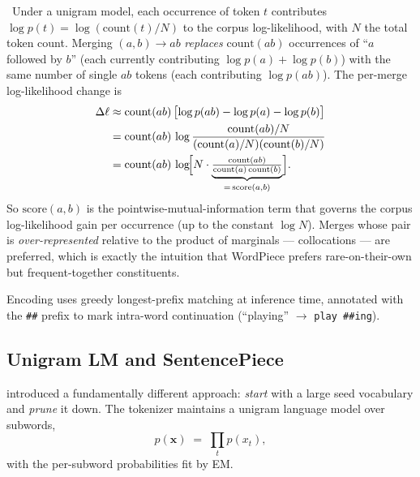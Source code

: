\begin{derivation}
\Assum\ Under a unigram model, each occurrence of token $t$
contributes $\log p(t) = \log(\mathrm{count}(t)/N)$ to the corpus
log-likelihood, with $N$ the total token count. Merging
$(a,b) \to ab$ \emph{replaces} $\mathrm{count}(ab)$ occurrences of
``$a$ followed by $b$'' (each currently contributing
$\log p(a) + \log p(b)$) with the same number of single $ab$ tokens
(each contributing $\log p(ab)$). The per-merge log-likelihood
change is
\begin{align*}
\Delta \ell &\approx \mathrm{count}(ab)\,\bigl[\log p(ab)
  - \log p(a) - \log p(b)\bigr]\\
&= \mathrm{count}(ab)\,\log
  \frac{\mathrm{count}(ab)/N}
       {(\mathrm{count}(a)/N)(\mathrm{count}(b)/N)}\\
&= \mathrm{count}(ab)\,\log\!\Bigl[N \cdot
  \underbrace{\tfrac{\mathrm{count}(ab)}
    {\mathrm{count}(a)\,\mathrm{count}(b)}}_{=\,\mathrm{score}(a,b)}\Bigr].
\end{align*}
So $\mathrm{score}(a,b)$ is the pointwise-mutual-information term
that governs the corpus log-likelihood gain per occurrence (up to
the constant $\log N$). Merges whose pair is \emph{over-represented}
relative to the product of marginals --- collocations --- are
preferred, which is exactly the intuition that WordPiece prefers
rare-on-their-own but frequent-together constituents.
\end{derivation}

Encoding uses greedy longest-prefix matching at inference time,
annotated with the \texttt{\#\#} prefix to mark intra-word
continuation (``playing'' $\to$ \texttt{play \#\#ing}).

\subsection{Unigram LM and SentencePiece}

\citet{kudo2018unigram} introduced a fundamentally different approach:
\emph{start} with a large seed vocabulary and \emph{prune} it down. The
tokenizer maintains a unigram language model over subwords,
\begin{equation}
\label{eq:week3-unigram}
p(\mathbf{x}) \;=\; \prod_{t} p(x_t),
\end{equation}
with the per-subword probabilities fit by EM.

